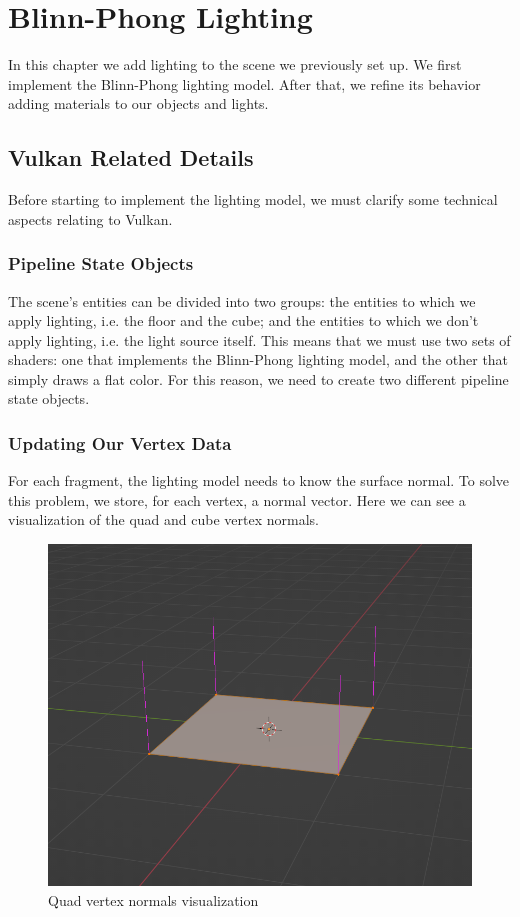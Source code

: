 \chapter{Blinn-Phong Lighting}
\label{chap:BlinnPhong}

In this chapter we add lighting to the scene we previously set up.
We first implement the Blinn-Phong lighting model.
After that, we refine its behavior adding materials to our objects and lights.

\section{Vulkan Related Details}

Before starting to implement the lighting model, we must clarify some technical
aspects relating to Vulkan.

\subsection{Pipeline State Objects}

The scene's entities can be divided into two groups: the entities to which we
apply lighting, i.e. the floor and the cube; and the entities to which we
don't apply lighting, i.e. the light source itself.
This means that we must use two sets of shaders: one that implements
the Blinn-Phong lighting model, and the other that simply draws a flat color.
For this reason, we need to create two different pipeline state objects.

\subsection{Updating Our Vertex Data}

For each fragment, the lighting model needs to know the surface normal.
To solve this problem, we store, for each vertex, a normal vector.
Here we can see a visualization of the quad and cube vertex normals.

\begin{figure}[H]
    \centering
    \includegraphics[scale=0.40]{images/ChBlinnPhong/QuadVertexNormals.png}
    \caption{Quad vertex normals visualization}
    \label{fig::QuadVertexNormals}
\end{figure}

